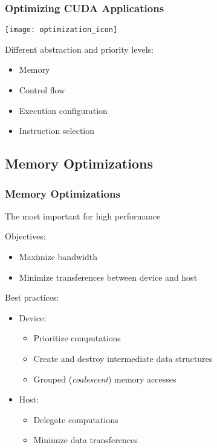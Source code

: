 \documentclass[10pt, compress]{beamer}
\begin{document}
\begin{frame}
    \frametitle{Optimizing CUDA Applications}
    \begin{center}
        \texttt{[image: optimization\_icon]}
    \end{center}

    Different \alert{abstraction} and \alert{priority} levels:

    \begin{itemize}
        \item Memory

        \item Control flow

        \item Execution configuration

        \item Instruction selection
    \end{itemize}
\end{frame}

\subsection{Memory Optimizations}

\begin{frame}
    \frametitle{Memory Optimizations}
    The \alert{most important} for \alert{high performance}


    Objectives:
    \begin{itemize}
        \item Maximize \alert{bandwidth}

        \item Minimize \alert{transferences} between device and host

    \end{itemize}

    Best practices:


    \begin{itemize}
        \item Device:

            \begin{itemize}
                \item Prioritize \alert{computations}

                \item Create and destroy \alert{intermediate data structures}

                \item \alert{Grouped} (\textit{coalescent}) memory accesses
            \end{itemize}

        \item Host:

            \begin{itemize}
                \item Delegate \alert{computations}

                \item Minimize \alert{data transferences}
            \end{itemize}
    \end{itemize}
\end{frame}
\end{document}
